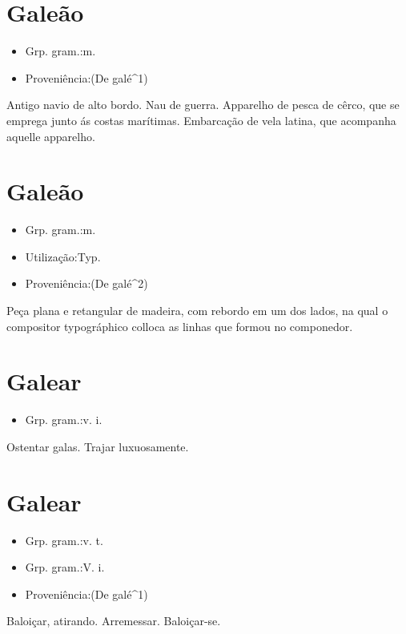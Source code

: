 \section{Galeão}
\begin{itemize}
\item {Grp. gram.:m.}
\end{itemize}
\begin{itemize}
\item {Proveniência:(De \textunderscore galé\textunderscore ^1)}
\end{itemize}
Antigo navio de alto bordo.
Nau de guerra.
Apparelho de pesca de cêrco, que se emprega junto ás costas marítimas.
Embarcação de vela latina, que acompanha aquelle apparelho.
\section{Galeão}
\begin{itemize}
\item {Grp. gram.:m.}
\end{itemize}
\begin{itemize}
\item {Utilização:Typ.}
\end{itemize}
\begin{itemize}
\item {Proveniência:(De \textunderscore galé\textunderscore ^2)}
\end{itemize}
Peça plana e retangular de madeira, com rebordo em um dos lados, na qual o compositor typográphico colloca as linhas que formou no componedor.
\section{Galear}
\begin{itemize}
\item {Grp. gram.:v. i.}
\end{itemize}
Ostentar galas.
Trajar luxuosamente.
\section{Galear}
\begin{itemize}
\item {Grp. gram.:v. t.}
\end{itemize}
\begin{itemize}
\item {Grp. gram.:V. i.}
\end{itemize}
\begin{itemize}
\item {Proveniência:(De \textunderscore galé\textunderscore ^1)}
\end{itemize}
Baloiçar, atirando.
Arremessar.
Baloiçar-se.
